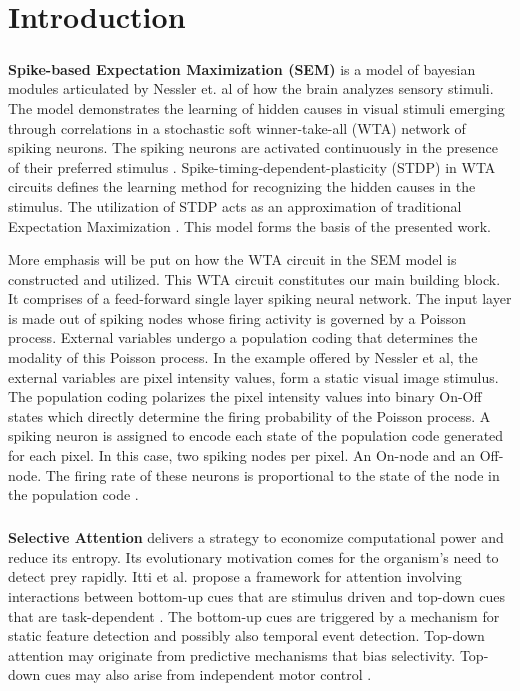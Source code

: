 \documentclass{report}
\begin{document}
\chapter{Introduction}

\paragraph{}\textbf{Spike-based Expectation Maximization (SEM)} is a model of bayesian modules articulated by Nessler et. al of how the brain analyzes sensory stimuli. The model demonstrates the learning of hidden causes in visual stimuli emerging through correlations in a stochastic soft winner-take-all (WTA) network of spiking neurons. The spiking neurons are activated continuously in the presence of their preferred stimulus \cite{Nessler2010}. Spike-timing-dependent-plasticity (STDP) in WTA circuits defines the learning method for recognizing the hidden causes in the stimulus. The utilization of STDP acts as an approximation of traditional Expectation Maximization \cite{Nessler2013}. This model forms the basis of the presented work.

More emphasis will be put on how the WTA circuit in the SEM model is constructed and utilized. This WTA circuit constitutes our main building block. It comprises of a feed-forward single layer spiking neural network. The input layer is made out of spiking nodes whose firing activity is governed  by a Poisson process. External variables undergo a population coding that determines the modality of this Poisson process. In the example offered by Nessler et al, the external variables are pixel intensity values, form a static visual image stimulus. The population coding polarizes the pixel intensity values into binary On-Off states which directly determine the firing probability of the Poisson process. A spiking neuron is assigned to encode each state of the population code generated for each pixel. In this case, two spiking nodes per pixel. An On-node and an Off-node. The firing rate of these neurons is proportional to the state of the node in the population code \cite{Nessler2010}.

\paragraph{}\textbf{Selective Attention} delivers a strategy to economize computational power and reduce its entropy. Its evolutionary motivation comes for the organism's need to detect prey rapidly. Itti et al. propose a framework for attention involving interactions between bottom-up cues that are stimulus driven and top-down cues that are task-dependent \cite{Itti2001}. The bottom-up cues are triggered by a mechanism for static feature detection and possibly also temporal event detection. Top-down attention may originate from predictive mechanisms that bias selectivity. Top-down cues may also arise from independent motor control \cite{Olshausen1993}.
\end{document}
